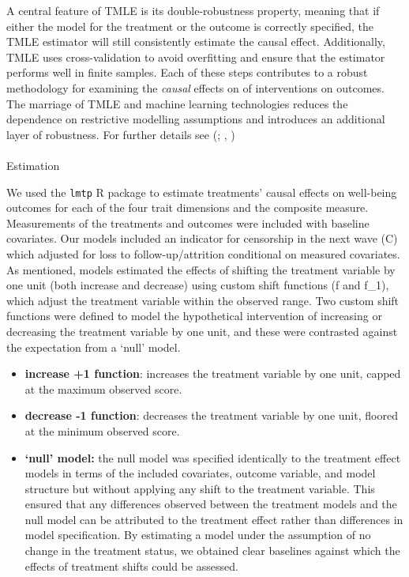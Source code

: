 \documentclass[
  singlecolumn]{article}
\makeatletter
\let\oldparagraph\paragraph
\renewcommand{\paragraph}{
    \@ifstar
      \xxxParagraphStar
      \xxxParagraphNoStar
  }
\newcommand{\xxxParagraphStar}[1]{\oldparagraph*{#1}\mbox{}}
\newcommand{\xxxParagraphNoStar}[1]{\oldparagraph{#1}\mbox{}}
\providecommand{\tightlist}{%
  \setlength{\itemsep}{0pt}\setlength{\parskip}{0pt}}\usepackage{longtable,booktabs,array}
\makeatother
\begin{document}
A central feature of TMLE is its double-robustness property, meaning
that if either the model for the treatment or the outcome is correctly
specified, the TMLE estimator will still consistently estimate the
causal effect. Additionally, TMLE uses cross-validation to avoid
overfitting and ensure that the estimator performs well in finite
samples. Each of these steps contributes to a robust methodology for
examining the \emph{causal} effects on of interventions on outcomes. The
marriage of TMLE and machine learning technologies reduces the
dependence on restrictive modelling assumptions and introduces an
additional layer of robustness. For further details see
(;
,
)

\paragraph{Estimation}\label{estimation}

We used the \texttt{lmtp} R package to estimate treatments' causal
effects on well-being outcomes for each of the four trait dimensions and
the composite measure. Measurements of the treatments and outcomes were
included with baseline covariates. Our models included an indicator for
censorship in the next wave (C) which adjusted for loss to
follow-up/attrition conditional on measured covariates. As mentioned,
models estimated the effects of shifting the treatment variable by one
unit (both increase and decrease) using custom shift functions (f and
f\_1), which adjust the treatment variable within the observed range.
Two custom shift functions were defined to model the hypothetical
intervention of increasing or decreasing the treatment variable by one
unit, and these were contrasted against the expectation from a `null'
model.

\begin{itemize}
\tightlist
\item
  \textbf{increase +1 function}: increases the treatment variable by one
  unit, capped at the maximum observed score.
\item
  \textbf{decrease -1 function}: decreases the treatment variable by one
  unit, floored at the minimum observed score.
\item
  \textbf{`null' model:} the null model was specified identically to the
  treatment effect models in terms of the included covariates, outcome
  variable, and model structure but without applying any shift to the
  treatment variable. This ensured that any differences observed between
  the treatment models and the null model can be attributed to the
  treatment effect rather than differences in model specification. By
  estimating a model under the assumption of no change in the treatment
  status, we obtained clear baselines against which the effects of
  treatment shifts could be assessed.
\end{itemize}
\end{document}
